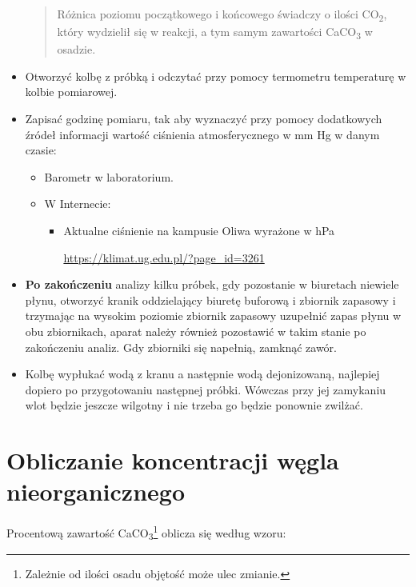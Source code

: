 \documentclass[
  letterpaper,
  DIV=11,
  numbers=noendperiod]{scrreprt}
\begin{document}
\begin{itemize}
  \begin{quote}
  Różnica poziomu początkowego i końcowego świadczy o ilości
  CO\textsubscript{2}, który wydzielił się w reakcji, a tym samym
  zawartości CaCO\textsubscript{3} w osadzie.
  \end{quote}
\item
  Otworzyć kolbę z próbką i odczytać przy pomocy termometru temperaturę
  w kolbie pomiarowej.
\item
  Zapisać godzinę pomiaru, tak aby wyznaczyć przy pomocy dodatkowych
  źródeł informacji wartość ciśnienia atmosferycznego w mm Hg w danym
  czasie:

  \begin{itemize}
  \item
    Barometr w laboratorium.
  \item
    W Internecie:

    \begin{itemize}
    \item
      Aktualne ciśnienie na kampusie Oliwa wyrażone w hPa

      \url{https://klimat.ug.edu.pl/?page_id=3261}
    \end{itemize}
  \end{itemize}
\item
  \textbf{Po zakończeniu} analizy kilku próbek, gdy pozostanie w
  biuretach niewiele płynu, otworzyć kranik oddzielający biuretę
  buforową i zbiornik zapasowy i trzymając na wysokim poziomie zbiornik
  zapasowy uzupełnić zapas płynu w obu zbiornikach, aparat należy
  również pozostawić w takim stanie po zakończeniu analiz. Gdy zbiorniki
  się napełnią, zamknąć zawór.
\item
  Kolbę wypłukać wodą z kranu a następnie wodą dejonizowaną, najlepiej
  dopiero po przygotowaniu następnej próbki. Wówczas przy jej zamykaniu
  wlot będzie jeszcze wilgotny i nie trzeba go będzie ponownie zwilżać.
\end{itemize}

\hypertarget{obliczanie-koncentracji-wux119gla-nieorganicznego}{%
\section{Obliczanie koncentracji węgla
nieorganicznego}\label{obliczanie-koncentracji-wux119gla-nieorganicznego}}

Procentową zawartość CaCO\textsubscript{3}\footnote{Zależnie od ilości
  osadu objętość może ulec zmianie.} oblicza się według wzoru:
\end{document}
